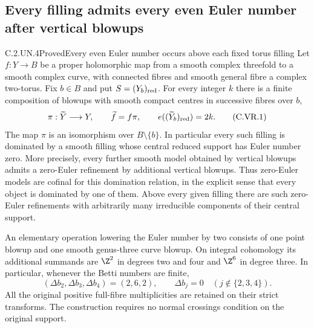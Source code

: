\subsection{Every filling admits every even Euler number after vertical blowups}

\begin{statement}{C.2.UN.4}{Proved}{Every even Euler number occurs above each fixed torus filling}
Let $f:Y\to B$ be a proper holomorphic map from a smooth complex
threefold to a smooth complex curve, with connected fibres and smooth
general fibre a complex two-torus. Fix $b\in B$ and put
$S=(Y_b)_{\rm red}$. For every integer $k$ there is a finite composition
of blowups with smooth compact centres in successive fibres over $b$,
\[
 \pi:\widetilde Y\longrightarrow Y,\qquad
 \widetilde f=f\pi,\qquad
 e((\widetilde Y_b)_{\rm red})=2k.                 \tag{C.VR.1}
\]
The map $\pi$ is an isomorphism over $B\setminus\{b\}$.
In particular every such filling is dominated by a smooth filling
whose central reduced support has Euler number zero. More precisely,
every further smooth model obtained by vertical blowups admits a
zero-Euler refinement by additional vertical blowups. Thus zero-Euler
models are cofinal for this domination relation, in the explicit sense
that every object is dominated by one of them.
Above every given filling there are such zero-Euler refinements with
arbitrarily many irreducible components of their central support.

An elementary operation lowering the Euler number by two consists of
one point blowup and one smooth genus-three curve blowup. On integral
cohomology its additional summands are $\Z^2$ in degrees two and four
and $\Z^6$ in degree three. In particular, whenever the Betti numbers
are finite,
\[
 (\Delta b_2,\Delta b_3,\Delta b_4)=(2,6,2),
 \qquad \Delta b_j=0\quad(j\notin\{2,3,4\}).       \tag{C.VR.2}
\]
All the original positive full-fibre multiplicities are retained on
their strict transforms. The construction requires no normal crossings
condition on the original support.
\end{statement}
